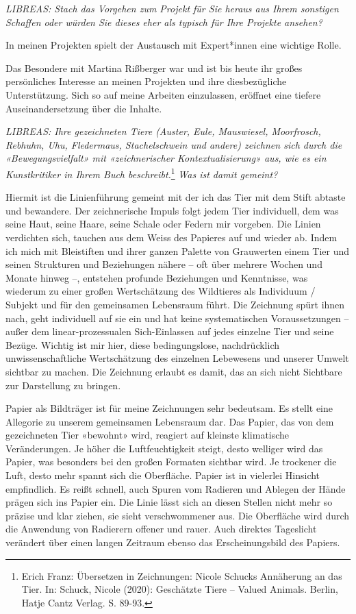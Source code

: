 \documentclass[a4paper,
fontsize=11pt,
oneside,
numbers=noperiodatend,
parskip=half-,
bibliography=totoc,
final
]{scrartcl}
\begin{document}
\emph{LIBREAS: Stach das Vorgehen zum Projekt für Sie heraus aus Ihrem
sonstigen Schaffen oder würden Sie dieses eher als typisch für Ihre
Projekte ansehen?}

In meinen Projekten spielt der Austausch mit Expert*innen eine wichtige
Rolle.

Das Besondere mit Martina Rißberger war und ist bis heute ihr großes
persönliches Interesse an meinen Projekten und ihre diesbezügliche
Unterstützung. Sich so auf meine Arbeiten einzulassen, eröffnet eine
tiefere Auseinandersetzung über die Inhalte.

\emph{LIBREAS: Ihre gezeichneten Tiere (Auster, Eule, Mauswiesel,
Moorfrosch, Rebhuhn, Uhu, Fledermaus, Stachelschwein und andere)
zeichnen sich durch die «Bewegungsvielfalt» mit «zeichnerischer
Kontextualisierung» aus, wie es ein Kunstkritiker in Ihrem Buch
beschreibt.}\footnote{Erich Franz: Übersetzen in Zeichnungen: Nicole
  Schucks Annäherung an das Tier. In: Schuck, Nicole (2020): Geschätzte
  Tiere -- Valued Animals. Berlin, Hatje Cantz Verlag. S. 89-93.}
\emph{Was ist damit gemeint?}

Hiermit ist die Linienführung gemeint mit der ich das Tier mit dem Stift
abtaste und bewandere. Der zeichnerische Impuls folgt jedem Tier
individuell, dem was seine Haut, seine Haare, seine Schale oder Federn
mir vorgeben. Die Linien verdichten sich, tauchen aus dem Weiss des
Papieres auf und wieder ab. Indem ich mich mit Bleistiften und ihrer
ganzen Palette von Grauwerten einem Tier und seinen Strukturen und
Beziehungen nähere -- oft über mehrere Wochen und Monate hinweg --,
entstehen profunde Beziehungen und Kenntnisse, was wiederum zu einer
großen Wertschätzung des Wildtieres als Individuum / Subjekt und für den
gemeinsamen Lebensraum führt. Die Zeichnung spürt ihnen nach, geht
individuell auf sie ein und hat keine systematischen Voraussetzungen --
außer dem linear-prozessualen Sich-Einlassen auf jedes einzelne Tier und
seine Bezüge. Wichtig ist mir hier, diese bedingungslose, nachdrücklich
unwissenschaftliche Wertschätzung des einzelnen Lebewesens und unserer
Umwelt sichtbar zu machen. Die Zeichnung erlaubt es damit, das an sich
nicht Sichtbare zur Darstellung zu bringen.

Papier als Bildträger ist für meine Zeichnungen sehr bedeutsam. Es
stellt eine Allegorie zu unserem gemeinsamen Lebensraum dar. Das Papier,
das von dem gezeichneten Tier «bewohnt» wird, reagiert auf kleinste
klimatische Veränderungen. Je höher die Luftfeuchtigkeit steigt, desto
welliger wird das Papier, was besonders bei den großen Formaten sichtbar
wird. Je trockener die Luft, desto mehr spannt sich die Oberfläche.
Papier ist in vielerlei Hinsicht empfindlich. Es reißt schnell, auch
Spuren vom Radieren und Ablegen der Hände prägen sich ins Papier ein.
Die Linie lässt sich an diesen Stellen nicht mehr so präzise und klar
ziehen, sie sieht verschwommener aus. Die Oberfläche wird durch die
Anwendung von Radierern offener und rauer. Auch direktes Tageslicht
verändert über einen langen Zeitraum ebenso das Erscheinungsbild des
Papiers.
\end{document}
